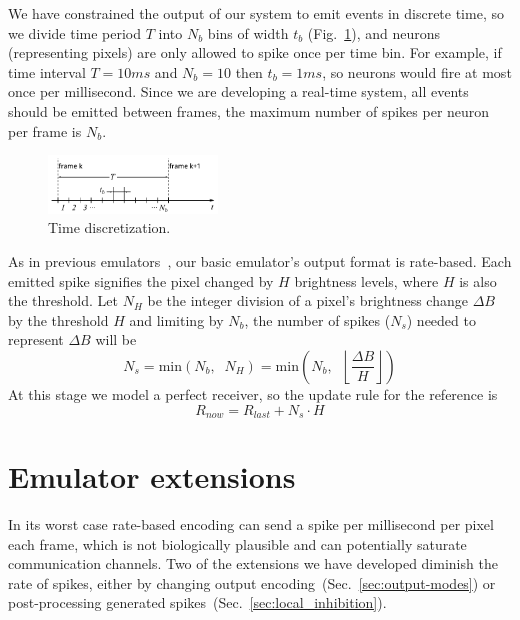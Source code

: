 \documentclass[conference]{IEEEtran}
\begin{document}
We have constrained the output of our system to emit events in discrete time, so we divide time period $T$ into $N_{b}$ bins of width $t_{b}$ (Fig.~\ref{fig:time_bins}), and neurons (representing pixels) are only allowed to spike once per time bin. For example, if time interval $T = 10 ms$ and $N_{b} = 10$ then $t_{b} = 1 ms$, so neurons would fire at most once per millisecond. Since we are developing a real-time system, all events should be emitted between frames, the maximum number of spikes per neuron per frame is $N_{b}$.

\begin{figure}[hbt]
  \centering
  \includegraphics[width=0.4\textwidth]{discrete_time_bins}
  \caption{Time discretization.}
  \label{fig:time_bins}
\end{figure}

As in previous emulators~\cite{DVSemu}, our basic emulator's output format is rate-based. Each emitted spike signifies the pixel changed by $H$ brightness levels, where $H$ is also the threshold. Let $N_{H}$ be the integer division of a pixel's brightness change $\Delta B$ by the threshold $H$ and limiting by $N_{b}$, the number of spikes ($N_{s}$) needed to represent $\Delta B$ will be
\begin{equation}
  \label{eq:num_spikes_rate}
  N_{s} = \mathrm{min}\left( N_{b}, \;\; N_{H} \right) 
        = \mathrm{min}\left( N_{b}, \;\; \left\lfloor\frac{\Delta B}{H}\right\rfloor \right)
\end{equation}
At this stage we model a perfect receiver, so the update rule for the reference is
\begin{equation}
  \label{eq:ref_update}
  R_{now} = R_{last} + N_{s}\cdot H
\end{equation}


\section{Emulator extensions}
\label{sec:emu-extensions}
In its worst case rate-based encoding can send a spike per millisecond per pixel each frame, which is not biologically plausible and can potentially saturate communication channels. 
Two of the extensions we have developed diminish the rate of spikes, either by changing output encoding~(Sec.~\ref{sec:output-modes}) or post-processing generated spikes~(Sec.~\ref{sec:local_inhibition}). 
\end{document}
